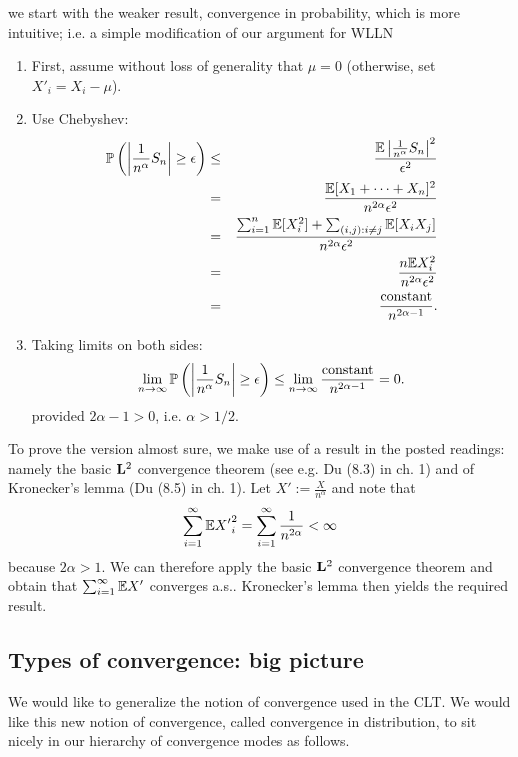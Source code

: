 \documentclass{article}
\begin{document}
 we start with the weaker result, convergence in probability, which is more intuitive; i.e. a simple modification of our argument for WLLN \begin{enumerate}
	\item First, assume without loss of generality that $\mu = 0$ (otherwise, set $X'_i = X_i - \mu$). 
	\item Use Chebyshev:
	\begin{eqnarray*}
		\P\left(\left|\frac{1}{n^\alpha}S_n\right| \ge \epsilon \right) &\le& \frac{\E\left| \frac{1}{n^\alpha} S_n \right|^2}{\epsilon^2} \\
		&=& \frac{\E[X_1 + \dots + X_n]^2}{n^{2\alpha} \epsilon^2} \\
		&=& \frac{\sum_{i=1}^n \E[X_i^2] + \sum_{(i,j):i\neq j} \E[X_i X_j]}{n^{2\alpha} \epsilon^2} \\
		&=& \frac{n \E X_i^2}{n^{2\alpha} \epsilon^2} \\
		&=& \frac{\text{constant}}{n^{2\alpha - 1}}.
	\end{eqnarray*}
	\item Taking limits on both sides: \[ \lim_{n\to\infty} \P\left(\left|\frac{1}{n^\alpha}S_n\right| \ge \epsilon \right) \le \lim_{n\to\infty} \frac{\text{constant}}{n^{2\alpha - 1}} = 0. \]
	provided $2\alpha - 1 > 0$, i.e. $\alpha > 1/2$.
\end{enumerate}
To prove the version almost sure, we make use of a result in the posted readings:
namely the basic $\L^2$ convergence theorem (see e.g. Du (8.3) in ch. 1) and
of Kronecker's lemma (Du (8.5) in ch. 1). Let $X' := \frac{X}{n^\alpha}$ and
note that
\begin{align*}
\sum_{i=1}^{\infty} \E {X'}_i^2 = \sum_{i=1}^{\infty} \frac{1}{n^{2\alpha}} <
\infty 
\end{align*}
because $2 \alpha > 1$. We can therefore apply the basic $\L^2$ convergence
theorem and obtain that $\sum_{i=1}^{\infty} \E X'$ converges a.s..  Kronecker's
lemma then yields the required result.



\subsection{Types of convergence: big picture}\label{sec:conv-types-big-picture}

We would like to generalize the notion of convergence used in the CLT. We would like this new notion of convergence, called convergence in distribution, to sit nicely in our hierarchy of convergence modes as follows. 
\end{document}
